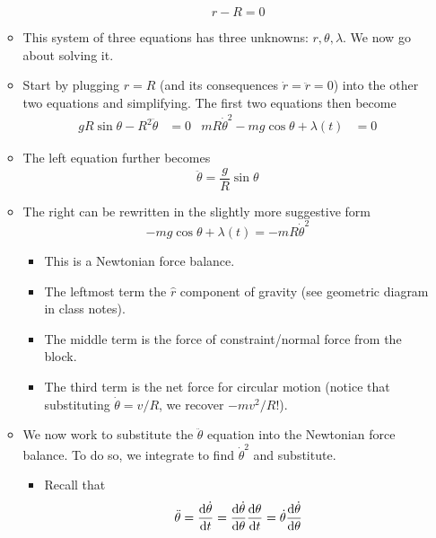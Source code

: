 \documentclass[../notes.tex]{subfiles}
\begin{document}
\begin{itemize}
\begin{itemize}
\begin{itemize}
            \begin{equation*}
                r-R = 0
            \end{equation*}
        \end{itemize}
        \item This system of three equations has three unknowns: $r,\theta,\lambda$. We now go about solving it.
        \item Start by plugging $r=R$ (and its consequences $\dot{r}=\ddot{r}=0$) into the other two equations and simplifying. The first two equations then become
        \begin{align*}
            gR\sin\theta-R^2\ddot{\theta} &= 0&
            mR\dot{\theta}^2-mg\cos\theta+\lambda(t) &= 0
        \end{align*}
        \item The left equation further becomes
        \begin{equation*}
            \ddot{\theta} = \frac{g}{R}\sin\theta
        \end{equation*}
        \item The right can be rewritten in the slightly more suggestive form
        \begin{equation*}
            -mg\cos\theta+\lambda(t) = -mR\dot{\theta}^2
        \end{equation*}
        \begin{itemize}
            \item This is a Newtonian force balance.
            \item The leftmost term the $\hat{r}$ component of gravity (see geometric diagram in class notes).
            \item The middle term is the force of constraint/normal force from the block.
            \item The third term is the net force for circular motion (notice that substituting $\dot{\theta}=v/R$, we recover $-mv^2/R$!).
        \end{itemize}
        \item We now work to substitute the $\ddot{\theta}$ equation into the Newtonian force balance. To do so, we integrate to find $\dot{\theta}^2$ and substitute.
        \begin{itemize}
            \item Recall that
            \begin{equation*}
                \ddot{\theta} = \dv{\dot{\theta}}{t}
                = \dv{\dot{\theta}}{\theta}\dv{\theta}{t}
                = \dot{\theta}\dv{\dot{\theta}}{\theta}

\end{equation*}
\end{itemize}
\end{itemize}
\end{itemize}
\end{document}
